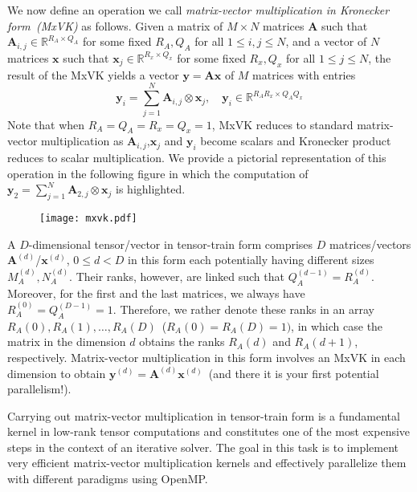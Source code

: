 \documentclass{article}
\newcommand{\mat}[1]{\mathbf{#1}}
\renewcommand{\vec}[1]{\mathbf{#1}}
\newcommand{\R}{\mathbb{R}}
\begin{document}
We now define an operation we call \textit{matrix-vector multiplication in Kronecker form~(MxVK)} as follows.
Given a matrix of $M \times N$ matrices $\mat{A}$ such that $\mat{A}_{i, j} \in \R^{R_A \times Q_A}$ for some fixed $R_A, Q_A$ for all $1 \le i, j \le N$, and a vector of $N$ matrices $\vec{x}$ such that $\vec{x}_j \in \R^{R_x \times Q_x}$ for some fixed $R_x, Q_x$ for all $1 \le j \le N$, the result of the MxVK yields a vector $\vec{y} = \mat{A} \vec{x}$ of $M$ matrices with entries 
\begin{equation*}
  \vec{y}_i = \sum_{j = 1}^{N} \mat{A}_{i, j} \otimes \vec{x}_j, \hspace{1em} \vec{y}_i \in \R^{R_A R_x \times Q_A Q_x}
  \label{eq:mxvk}
\end{equation*}
Note that when $R_A = Q_A = R_x = Q_x = 1$, MxVK reduces to standard matrix-vector multiplication as $\mat{A}_{i, j}$,$\vec{x}_j$ and $\vec{y}_i$ become scalars and Kronecker product reduces to scalar multiplication.
We provide a pictorial representation of this operation in the following figure in which the computation of $\vec{y}_2 = \sum_{j = 1}^{N} \mat{A}_{2, j} \otimes \vec{x}_j$ is highlighted.
\begin{figure}[H]
\centering
\texttt{[image: mxvk.pdf]}
\end{figure}

A $D$-dimensional tensor/vector in tensor-train form comprises $D$ matrices/vectors $\mat{A}^{(d)}$/$\vec{x}^{(d)}$, $0 \le d < D$ in this form each potentially having different sizes $M_A^{(d)}, N_A^{(d)}$.
Their ranks, however, are linked such that $Q_A^{(d - 1)} = R_A^{(d)}$.
Moreover, for the first and the last matrices, we always have $R_A^{(0)} = Q_A^{(D - 1)} = 1$.
Therefore, we rather denote these ranks in an array $R_A(0), R_A(1), \dots, R_A(D)$~($R_A(0) = R_A(D) = 1)$, in which case the matrix in the dimension $d$ obtains the ranks $R_A(d)$ and $R_A(d + 1)$, respectively.
Matrix-vector multiplication in this form involves an MxVK in each dimension to obtain $\vec{y}^{(d)} = \mat{A}^{(d)} \vec{x}^{(d)}$~(and there it is your first potential parallelism!).

Carrying out matrix-vector multiplication in tensor-train form is a fundamental kernel in low-rank tensor computations and constitutes one of the most expensive steps in the context of an iterative solver.
The goal in this task is to implement very efficient matrix-vector multiplication kernels and effectively parallelize them with different paradigms using OpenMP.
\end{document}
